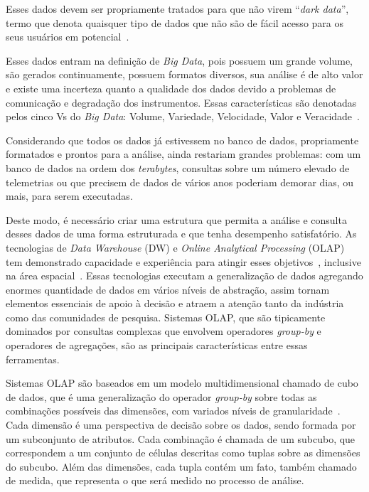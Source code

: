Esses dados devem ser propriamente tratados para que não virem ``\textit{dark data}'', termo que denota quaisquer tipo de dados que não são de fácil acesso para os seus usuários em potencial~\cite{heidornSheddingLightDark2008}.

Esses dados entram na definição de \textit{Big Data}, pois possuem um grande volume, são gerados continuamente, possuem formatos diversos, sua análise é de alto valor e existe uma incerteza quanto a qualidade dos dados devido a problemas de comunicação e degradação dos instrumentos.
Essas características são denotadas pelos cinco Vs do \textit{Big Data}: Volume, Variedade, Velocidade, Valor e Veracidade~\cite{kacfahemaniUnderstandableBigData2015}.

Considerando que todos os dados já estivessem no banco de dados, propriamente formatados e prontos para a análise, ainda restariam grandes problemas: com um banco de dados na ordem dos \textit{terabytes}, {\color{cerulean}consultas sobre um número elevado de telemetrias} ou que precisem de dados de vários anos poderiam demorar dias, ou mais, para serem executadas.

Deste modo, é necessário criar uma estrutura que permita a análise e consulta desses dados de uma forma estruturada e que tenha desempenho satisfatório.
As tecnologias de \textit{Data Warehouse} (DW) e \textit{Online Analytical Processing} (OLAP) tem demonstrado capacidade e experiência para atingir esses objetivos~\cite{bimonteOpenIssuesBig2016}, inclusive na área espacial~\cite{yvernesCopernicusGroundSegment2018}.
Essas tecnologias executam a generalização de dados agregando enormes quantidade de dados em vários níveis de abstração, assim tornam elementos essenciais de apoio à decisão e atraem a atenção tanto da indústria como das comunidades de pesquisa.
Sistemas OLAP, que são tipicamente dominados por consultas complexas que envolvem operadores \textit{group-by} e operadores de agregações, são as principais características entre essas ferramentas.

Sistemas OLAP são baseados em um modelo multidimensional chamado de cubo de dados, que é uma generalização do operador \textit{group-by} sobre todas as combinações possíveis das dimensões, com variados níveis de granularidade~\cite{grayDataCubeRelational1996}.
{\color{cerulean}
Cada dimensão é uma perspectiva de decisão sobre os dados, sendo formada por um subconjunto de atributos.
}
Cada combinação é chamada de um subcubo, que correspondem a um conjunto de células descritas como tuplas sobre as dimensões do subcubo.
Além das dimensões, cada tupla contém um fato, também chamado de medida, que representa o que será medido no processo de análise.

